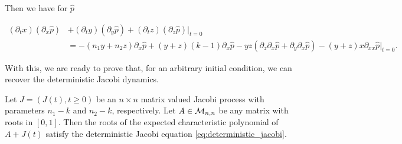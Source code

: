     Then we have for $\hat p$

    \begin{align*}
        (\partial_t x)(\partial_x \hat p) &+ (\partial_t y)(\partial_y \hat p) + (\partial_t z)(\partial_z \hat p)|_{t=0} \\ 
        &= -(n_1y + n_2 z)\partial_x \hat p + (y+z)(k-1)\partial_x \hat p - yz (\partial_z\partial_x \hat p + \partial_y\partial_x \hat p) - (y+z)x\partial_{xx} \hat p|_{t=0}.
    \end{align*}

    With this, we are ready to prove that, for an arbitrary initial condition, we can recover the deterministic Jacobi dynamics.

    \begin{theorem}
        Let $J = (J(t), t \ge 0)$ be an $n\times n$ matrix valued Jacobi process with parameters $n_1 - k$ and $n_2 - k$, respectively. Let $A \in \mathcal M_{n,n}$ be any matrix with roots in $[0,1]$. Then the roots of the expected characteristic polynomial of $A + J(t)$ satisfy the deterministic Jacobi equation \eqref{eq:deterministic_jacobi}.
    \end{theorem}


